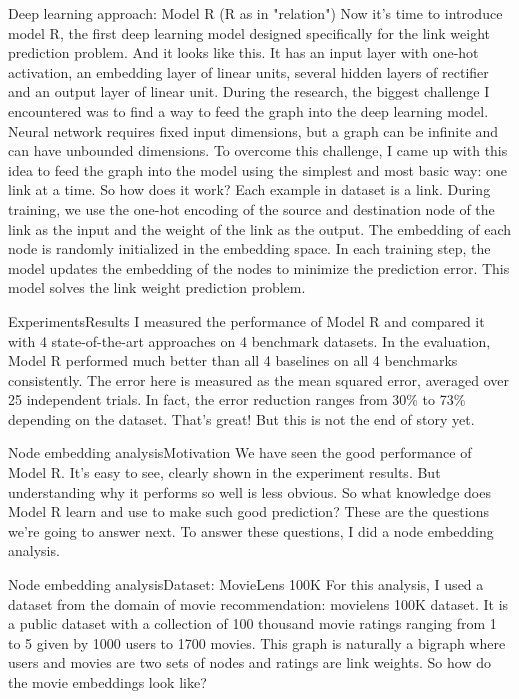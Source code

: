 \documentclass{beamer}
\begin{document}
\begin{frame}{Deep learning approach: Model R (R as in "relation")}
Now it's time to introduce model R, the first deep learning model designed specifically for the link weight prediction problem. And it looks like this. It has an input layer with one-hot activation, an embedding layer of linear units, several hidden layers of rectifier and an output layer of linear unit. During the research, the biggest challenge I encountered was to find a way to feed the graph into the deep learning model. Neural network requires fixed input dimensions, but a graph can be infinite and can have unbounded dimensions. To overcome this challenge, I came up with this idea to feed the graph into the model using the simplest and most basic way: one link at a time. So how does it work? Each example in dataset is a link. During training, we use the one-hot encoding of the source and destination node of the link as the input and the weight of the link as the output. The embedding of each node is randomly initialized in the embedding space. In each training step, the model updates the embedding of the nodes to minimize the prediction error. This model solves the link weight prediction problem.
\end{frame}

\begin{frame}{Experiments}{Results}
I measured the performance of Model R and compared it with 4 state-of-the-art approaches on 4 benchmark datasets. In the evaluation, Model R performed much better than all 4 baselines on all 4 benchmarks consistently. The error here is measured as the mean squared error, averaged over 25 independent trials. In fact, the error reduction ranges from 30\% to 73\% depending on the dataset. That's great! But this is not the end of story yet.
\end{frame}

\begin{frame}{Node embedding analysis}{Motivation}
We have seen the good performance of Model R. It's easy to see, clearly shown in the experiment results. But understanding why it performs so well is less obvious. So what knowledge does Model R learn and use to make such good prediction? These are the questions we're going to answer next. To answer these questions, I did a node embedding analysis.
\end{frame}

\begin{frame}{Node embedding analysis}{Dataset: MovieLens 100K}
For this analysis, I used a dataset from the domain of movie recommendation: movielens 100K dataset. It is a public dataset with a collection of 100 thousand movie ratings ranging from 1 to 5 given by 1000 users to 1700 movies. This graph is naturally a bigraph where users and movies are two sets of nodes and  ratings are link weights. So how do the movie embeddings look like?
\end{frame}
\end{document}
